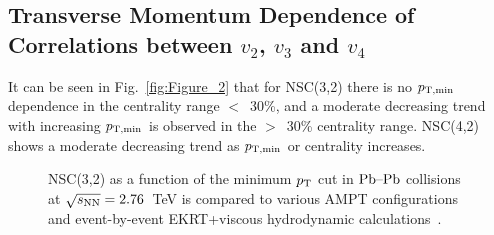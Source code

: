 \subsection{Transverse Momentum Dependence of Correlations between $v_2$, $v_3$ and $v_4$}
\label{sec:ptdepsc}

It can be seen in Fig.~\ref{fig:Figure_2} that for NSC(3,2) there is no $p_{\rm T, min}$ dependence in the centrality range $<$~30\%, and a moderate decreasing trend with increasing $p_{\rm T, min}$ is observed in the $>$~30\% centrality range.
NSC(4,2) shows a moderate decreasing trend as $p_{\rm T, min}$ or centrality increases. 

\begin{figure}[p]
             \begin{center}
              \end{center}
             \caption{NSC(3,2) as a function of the minimum $p_{\rm T}$ cut in $\textnormal{Pb--Pb}$ collisions at $\sqrt{s_{\textnormal{NN}}}=2.76$~TeV is compared to various AMPT configurations and event-by-event EKRT+viscous hydrodynamic calculations~\cite{Niemi:2015qia}.}
             \label{fig:Figure_6}
\end{figure}

